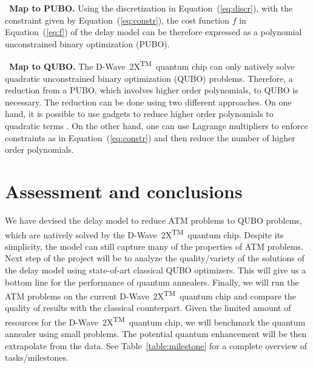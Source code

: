 \documentclass[9pt]{extarticle}
\newcommand{\equationname}{Equation}
\renewcommand{\tablename}{Table}
\newcommand{\DW}{\mbox{D-Wave 2X\textsuperscript{TM}}~}
\begin{document}
\begin{changemargin}{0.5cm}{0.5cm}
\textbullet~\textbf{Map to PUBO.} Using the discretization in \equationname~(\ref{eq:discr}), with the constraint given by \equationname~(\ref{eq:constr}), the cost function
$f$ in \equationname~(\ref{eq:f}) of the delay model can be therefore expressed as a polynomial unconstrained binary optimization (PUBO).
\end{changemargin}

\begin{changemargin}{0.5cm}{0.5cm}
\textbullet~\textbf{Map to QUBO.} The \DW quantum chip can only natively solve quadratic unconstrained binary optimization (QUBO) problems. Therefore, a reduction 
from a PUBO, which involves higher order polynomials, to QUBO is necessary. The reduction can be done using two different approaches. On one hand, it is possible to
use gadgets to reduce higher order polynomials to quadratic terms \cite{babbush:13}. On the other hand, one can use Lagrange multipliers \cite{ronagh:15} 
to enforce constraints as in \equationname~(\ref{eq:constr}) and then reduce the number of higher order polynomials.
\end{changemargin}

\section*{Assessment and conclusions}\label{sec:ass}

We have devised the delay model to reduce ATM problems to QUBO problems, which are natively solved by the \DW quantum chip. Despite its simplicity,
the model can still capture many of the properties of ATM problems. Next step of the project will be to analyze the quality/variety of the solutions
of the delay model using state-of-art classical QUBO optimizers. This will give us a bottom line for the performance of quantum annealers. Finally,
we will run the ATM problems on the current \DW quantum chip and compare the quality of results with the classical counterpart. Given the limited
amount of resources for the \DW quantum chip, we will benchmark the quantum annealer using small problems. The potential quantum enhancement will
be then extrapolate from the data. See \tablename~\ref{table:milestone} for a complete overview of tasks/milestones.



\end{document}
